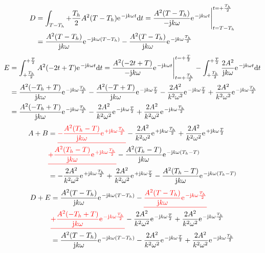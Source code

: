 \documentclass[11pt,a4paper,DIV=12]{scrartcl}
\newcommand{\ured}[1]{\textcolor{red}{\underline{#1}}}
\newcommand{\diff}{\mathrm{d}}
\begin{document}
%
%
%
\begin{align}
	D&=\int_{T-T_h}{+\frac{T_h}{2}}A^2(T-T_h)\e^{-\im k \omega t}\diff t=\frac{A^2(T-T_h)}{-\im k \omega}\e^{-\im k \omega t}\Bigg |_{t=T-T_h}^{t=+\frac{T_h}{2}}\nonumber \\
	&=\frac{A^2(T-T_h)}{\im k \omega}\e^{-\im k \omega(T-T_h)}-\frac{A^2(T-T_h)}{\im k \omega}\e^{-\im k \omega \frac{T_h}{2}}
\end{align}
%
%
%
\begin{align}
	E&=\int_{+\frac{T_h}{2}}^{+\frac{T}{2}}A^2(-2t+T)\e^{-\im k \omega t}\diff t=\frac{A^2(-2t+T)}{-\im k \omega }\e^{-\im k \omega t}\Bigg |_{t=+\frac{T_h}{2}}^{t=+\frac{T}{2}}-\int_{+\frac{T_h}{2}}^{+\frac{T}{2}}\frac{2A^2}{\im k \omega}\e^{-\im k \omega t}\diff t\nonumber \\
	&=\frac{A^2(-T_h+T)}{\im k \omega}\e^{-\im k \omega \frac{T_h}{2}}-\frac{A^2(-T+T)}{\im k \omega}\e^{-\im k \omega \frac{T}{2}}-\frac{2A^2}{k^2\omega^2}\e^{-\im k \omega \frac{T}{2}}+\frac{2A^2}{k^2\omega^2}\e^{-\im k \omega \frac{T_h}{2}}\nonumber \\
	&=\frac{A^2(-T_h+T)}{\im k \omega}\e^{-\im k\omega \frac{T_h}{2}}-\frac{2A^2}{k^2\omega^2}\e^{-\im k \omega \frac{T}{2}}+\frac{2A^2}{k^2\omega^2}\e^{-\im k \omega \frac{T_h}{2}}
\end{align}
%
%
%
\begin{align}
	A+B&=\ured{-\frac{A^2(T_h-T)}{\im k \omega}\e^{+\im k \omega \frac{T_h}{2}}}-\frac{2A^2}{k^2\omega^2}\e^{+\im k \omega \frac{T_h}{2}}+\frac{2A^2}{k^2\omega^2}\e^{+\im k \omega \frac{T}{2}}\nonumber \\
	&\ured{+\frac{A^2(T_h-T)}{\im k \omega}\e^{+\im k \omega \frac{T_h}{2}}}-\frac{A^2(T_h-T)}{\im k \omega}\e^{-\im k \omega (T_h-T)}\nonumber \\
	&=-\frac{2A^2}{k^2\omega^2}\e^{+\im k \omega \frac{T_h}{2}}+\frac{2A^2}{k^2\omega^2}\e^{+\im k \omega \frac{T}{2}}-\frac{A^2(T_h-T)}{\im k \omega}\e^{-\im k \omega (T_h-T)}
\end{align}
%
%
%
\begin{align}
	D+E&=\frac{A^2(T-T_h)}{\im k \omega}\e^{-\im k \omega(T-T_h)}-\ured{\frac{A^2(T-T_h)}{\im k \omega}\e^{-\im k \omega \frac{T_h}{2}}}\nonumber \\
	&\ured{+\frac{A^2(-T_h+T)}{\im k \omega}\e^{-\im k\omega \frac{T_h}{2}}}-\frac{2A^2}{k^2\omega^2}\e^{-\im k \omega \frac{T}{2}}+\frac{2A^2}{k^2\omega^2}\e^{-\im k \omega \frac{T_h}{2}}\nonumber \\
	&=\frac{A^2(T-T_h)}{\im k \omega}\e^{-\im k \omega(T-T_h)}-\frac{2A^2}{k^2\omega^2}\e^{-\im k \omega \frac{T}{2}}+\frac{2A^2}{k^2\omega^2}\e^{-\im k \omega \frac{T_h}{2}}
\end{align}
\end{document}
